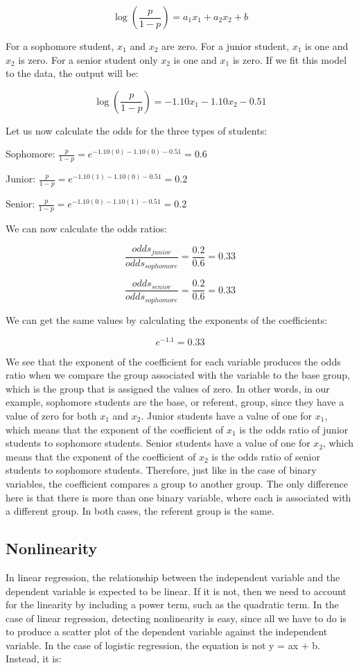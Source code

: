 \documentclass[a4paper,12pt,oneside]{book}
\begin{document}
$$ \log(\frac{p}{1-p})=a_1x_1+a_2x_2+b $$

For a sophomore student, $x_1$ and $x_2$ are zero. For a junior student, $x_1$ is one and $x_2$ is zero. For a senior student only $x_2$ is one and $x_1$ is zero. If we fit this model to the data, the output will be:

$$ \log(\frac{p}{1-p})=-1.10x_1-1.10x_2-0.51 $$

Let us now calculate the odds for the three types of students:

Sophomore: $ \frac{p}{1-p}=e^{-1.10(0)-1.10(0)-0.51}=0.6 $

Junior: $ \frac{p}{1-p}=e^{-1.10(1)-1.10(0)-0.51}=0.2 $

Senior: $ \frac{p}{1-p}=e^{-1.10(0)-1.10(1)-0.51}=0.2 $

We can now calculate the odds ratios:

$$ \frac{odds_{junior}}{odds_{sophomore}}=\frac{0.2}{0.6}=0.33 $$

$$ \frac{odds_{senior}}{odds_{sophomore}}=\frac{0.2}{0.6}=0.33 $$

We can get the same values by calculating the exponents of the coefficients:

$$ e^{-1.1}=0.33 $$

We see that the exponent of the coefficient for each variable produces the odds ratio when we compare the group associated with the variable to the base group, which is the group that is assigned the 
values of zero. In other words, in our example, sophomore students are the base, or referent, group, since they have a value of zero for both $x_1$ and $x_2$. Junior students have a value of one for $x_1$, which 
means that the exponent of the coefficient of $x_1$ is the odds ratio of junior students to sophomore students. Senior students have a value of one for $x_2$, which means that the exponent of the coefficient of 
$x_2$ is the odds ratio of senior students to sophomore students. Therefore, just like in the case of binary variables, the coefficient compares a group to another group. The only difference here is that there 
is more than one binary variable, where each is associated with a different group. In both cases, the referent group is the same.
\subsection{Nonlinearity}
In linear regression, the relationship between the independent variable and the dependent variable is expected to be linear. If it is not, then we need to account for the linearity by including a power term, 
such as the quadratic term. In the case of linear regression, detecting nonlinearity is easy, since all we have to do is to produce a scatter plot of the dependent variable against the independent variable. 
In the case of logistic regression, the equation is not y = ax + b. Instead, it is:
\end{document}
